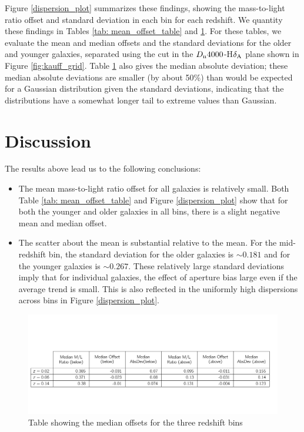 Figure \ref{dispersion_plot} summarizes these findings, showing
the mass-to-light ratio offset and standard deviation in each bin 
for each redshift.
We quantity these findings in Tables \ref{tab: mean_offset_table} 
and  \ref{tab: median_offsets}. For these tables, we evaluate the
mean and median offsets and the standard deviations for the older 
and younger galaxies, separated using the cut in the 
$D_{\rm n}4000$-H$\delta_{\rm A}$ plane shown in 
Figure \ref{fig:kauff_grid}.  Table \ref{tab: median_offsets} also 
gives the median absolute deviation; these median absolute deviations
are smaller (by about 50\%) than would be expected for a Gaussian 
distribution given the standard deviations, indicating that the 
distributions have a somewhat longer tail to extreme values than
Gaussian.
 

\section{Discussion}
\label{ch2_discussion}
The results above lead us to the following conclusions:

\begin{itemize}
\item{The mean mass-to-light ratio offset for all galaxies is relatively 
small. Both Table \ref{tab: mean_offset_table} and Figure 
\ref{dispersion_plot} show that for both the younger and older galaxies 
in all bins, there is a slight negative mean and median offset.}
\item{The scatter about the mean is substantial relative to the mean. 
For the mid-redshift bin, the standard deviation for the older galaxies 
is $\sim 0.181$ and for the younger galaxies is $\sim 0.267$. These 
relatively large standard deviations imply that for individual galaxies, 
the effect of aperture bias large even if the average trend is small. 
This is also reflected in the uniformly high dispersions across bins 
in Figure \ref{dispersion_plot}.}
\end{itemize}

\begin{figure}
\includegraphics[width=\textwidth]{figures/table_median.pdf}
\caption[Table showing the median offsets for the three redshift bins.]
{Table showing the median offsets for the three redshift bins
\label{tab: median_offsets}}
\end{figure}

